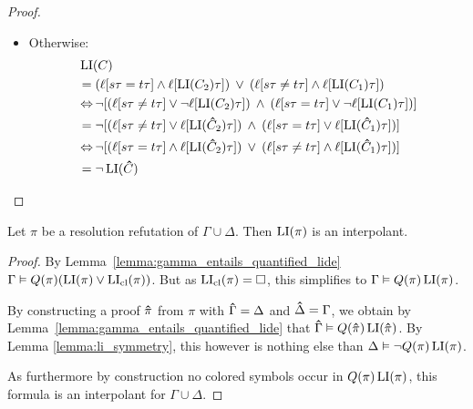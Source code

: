 \documentclass[,%
	draft=false,%
	numbers=noendperiod
	11pt,
	a4paper,
	oneside,%
	openany,
]{memoir}
\begin{document}
\begin{proof}
\begin{itemize}
\begin{itemize}
				\item Otherwise:
					\begin{align*}
						&\operatorname{LI}(C) \\
						&= (\ell[s\tau=t\tau] \land \ell[\operatorname{LI}(C_2)\tau] ) \;\,{\lor}\;\, (\ell[s\tau\neq t\tau] \land \ell[\operatorname{LI}(C_1)\tau]) \\
						&\operatorname{\Leftrightarrow} \lnot [ (\ell[s\tau\neq t\tau] \lor \lnot \ell[\operatorname{LI}(C_2)\tau] ) \;\,{\land}\;\, (\ell[s\tau= t\tau] \lor \lnot \ell[\operatorname{LI}(C_1)\tau]) ] \\
						&= \lnot [ (\ell[s\tau\neq t\tau] \lor \ell[\operatorname{LI}(\bm\hat C_2)\tau] ) \;\,{\land}\;\, (\ell[s\tau= t\tau] \lor \ell[\operatorname{LI}(\bm\hat C_1)\tau]) ] \\
						&\operatorname{\Leftrightarrow} \lnot [ (\ell[s\tau= t\tau] \land \ell[\operatorname{LI}(\bm\hat C_2)\tau] ) \;\,{\lor}\;\, (\ell[s\tau\neq t\tau] \land \ell[\operatorname{LI}(\bm\hat C_1)\tau]) ] \\
						&= \lnot \operatorname{LI}(\bm\hat C)
					\end{align*}



			\end{itemize}


			\qedhere

	\end{itemize}
\end{proof}

\begin{thm}
	Let $\pi$ be a resolution refutation of $\Gamma\cup\Delta$.
	Then $\operatorname{LI}( \pi )$ is an interpolant.
\end{thm}
\begin{proof}
	By Lemma~\ref{lemma:gamma_entails_quantified_lide}
	$\Gamma \vDash Q(\pi)(\operatorname{LI}(\pi) \lor \operatorname{LI}_{\operatorname{cl}}(\pi))$.
	But as $\operatorname{LI}_{\operatorname{cl}}(\pi) = \square$, this simplifies to
	$\Gamma \vDash Q(\pi)\operatorname{LI}(\pi)$.

	By constructing a proof $\bm\hat \pi$ from $\pi$ with $\bm\hat \Gamma = \Delta$ and $\bm\hat \Delta = \Gamma$, we obtain by Lemma~\ref{lemma:gamma_entails_quantified_lide} that $\bm\hat\Gamma \vDash Q(\bm\hat \pi)\operatorname{LI}(\bm\hat \pi)$.
	By Lemma \ref{lemma:li_symmetry}, this however is nothing else than
	$\Delta \vDash \lnot Q(\pi) \operatorname{LI}(\pi)$. 

	As furthermore by construction no colored symbols occur in $Q(\pi) \operatorname{LI}(\pi)$, this formula is an interpolant for $\Gamma\cup\Delta$.
\end{proof}
\end{document}
